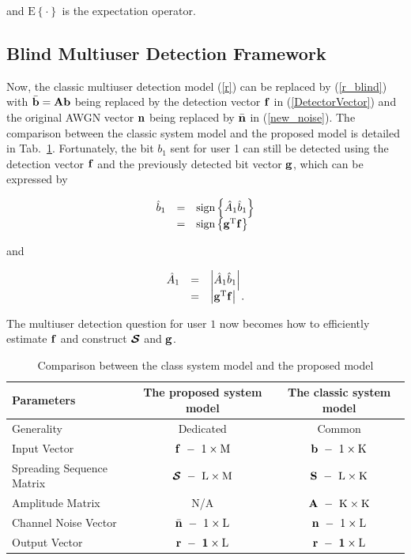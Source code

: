 \documentclass[a4paper,11pt,fleqn]{article}
\newcommand{\bA}{{\mathbf A}}
\newcommand{\bb}{{\bf b}}
\newcommand{\bg}{{\bf g}}
\newcommand{\bn}{{\bf n}}
\newcommand{\bbf}{{\bf f}}
\newcommand{\bS}{{\bf S}}
\newcommand{\bcS}{{\mbox {\boldmath ${\cal S}$}}}
\begin{document}
\noindent and $\mbox{E}\left\{\cdot\right\}$ is the expectation
operator.


\subsection{Blind Multiuser Detection Framework}

Now, the classic multiuser detection model (\ref{r}) can be
replaced by (\ref{r_blind}) with $\bar{\bb}=\bA\bb$ being replaced
by the detection vector $\bbf$ in (\ref{DetectorVector}) and the
original AWGN vector $\bn$ being replaced by $\bar{\bn}$ in
(\ref{new_noise}). The comparison between the classic system model
and the proposed model is detailed in Tab.~\ref{ModelComp}.
Fortunately, the bit $b_1$ sent for user 1 can still be detected
using the detection vector $\bbf$ and the previously detected bit
vector $\bg$, which can be expressed by

\begin{equation}
\begin{array}{rcl}
\hat{b}_1 &=& \mbox{sign}\left\{\hat{A}_1\hat{b}_1\right\}\\
&=&\mbox{sign}\left\{\bg^{\rm T}\bbf\right\}\
\end{array} \label{b_estimation}
\end{equation}

\noindent and

\begin{equation}
\begin{array}{rcl}
\hat{A}_1 &=& \left|\hat{A}_1\hat{b}_1\right|\\
&=&\left|\bg^{\rm T}\bbf\right|\ .
\end{array} \label{A_estimation}
\end{equation}


\noindent The multiuser detection question for user $1$ now
becomes how to efficiently estimate $\bbf$ and construct $\bcS$
and $\bg$.


\begin{table}
\caption{Comparison between the class system model and the
proposed model}\label{ModelComp}
\begin{center}
\begin{tabular}{lcc}
Parameters&The proposed system model&The classic system model\\
\hline
Generality& Dedicated& Common\\
Input Vector &$\bbf\ -\ 1\times\rm M$&$\bb\ -\ 1\times\rm K$\\
Spreading Sequence Matrix &$\bcS\ -\ \rm L\times\rm M$&$\bS\ -\ \rm L\times\rm K$\\
Amplitude Matrix & N/A &$\bf{A}\ -\ \rm K\times\rm K$\\
Channel Noise Vector &$\bar\bn\ -\ 1\times\rm L$&$\bn\ -\ 1\times\rm L$\\
Output Vector&$\bf{r}\ -\ 1\times\rm L$&$\bf{r}\ -\ 1\times\rm L$\\
 \hline
\end{tabular}
\end{center}
\end{table}
\end{document}
